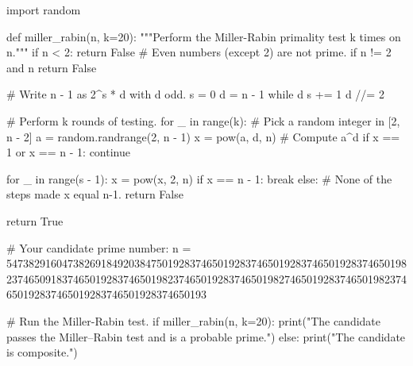 import random

def miller_rabin(n, k=20):
    """Perform the Miller-Rabin primality test k times on n."""
    if n < 2:
        return False
    # Even numbers (except 2) are not prime.
    if n != 2 and n %
        return False

    # Write n - 1 as 2^s * d with d odd.
    s = 0
    d = n - 1
    while d %
        s += 1
        d //= 2

    # Perform k rounds of testing.
    for _ in range(k):
        # Pick a random integer in [2, n - 2]
        a = random.randrange(2, n - 1)
        x = pow(a, d, n)  # Compute a^d %
        if x == 1 or x == n - 1:
            continue

        for _ in range(s - 1):
            x = pow(x, 2, n)
            if x == n - 1:
                break
        else:
            # None of the steps made x equal n-1.
            return False

    return True

# Your candidate prime number:
n = 547382916047382691849203847501928374650192837465019283746501928374650198237465091837465019283746501982374650192837465019827465019283746501982374650192837465019283746501928374650193

# Run the Miller-Rabin test.
if miller_rabin(n, k=20):
    print("The candidate passes the Miller–Rabin test and is a probable prime.")
else:
    print("The candidate is composite.")
